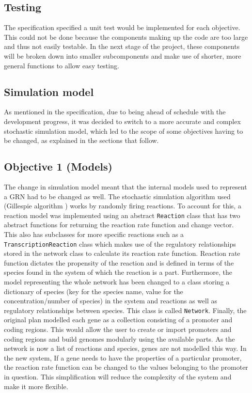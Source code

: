 \documentclass{article}
\begin{document}
	\subsection{Testing} \label{progress-testing}
	The specification specified a unit test would be implemented for each objective. This could not be done because the components making up the code are too large and thus not easily testable. In the next stage of the project, these components will be broken down into smaller subcomponents and make use of shorter, more general functions to allow easy testing.
	
	
	\subsection{Simulation model} \label{sim-model}
	As mentioned in the specification, due to being ahead of schedule with the development progress, it was decided to switch to a more accurate and complex stochastic simulation model, which led to the scope of some objectives having to be changed, as explained in the sections that follow.
	
	\subsection{Objective 1 (Models)}  
	The change in simulation model meant that the internal models used to represent a GRN had to be changed as well. The stochastic simulation algorithm used (Gillespie algorithm \cite{gillespie_original}) works by randomly firing reactions. To account for this, a reaction model was implemented using an abstract \verb|Reaction| class that has two abstract functions for returning the reaction rate function and change vector. This also has subclasses for more specific reactions such as a \verb|TranscriptionReaction| class which makes use of the regulatory relationships stored in the network class to calculate its reaction rate function. Reaction rate function dictates the propensity of the reaction and is defined in terms of the species found in the system of which the reaction is a part. Furthermore, the model representing the whole network has been changed to a class storing a dictionary of species (key for the species name, value for the concentration/number of species) in the system and reactions as well as regulatory relationships between species. This class is called \verb|Network|. Finally, the original plan modelled each gene as a collection consisting of a promoter and coding regions. This would allow the user to create or import promoters and coding regions and build genomes modularly using the available parts. As the network is now a list of reactions and species, genes are not modelled this way. In the new system, If a gene needs to have the properties of a particular promoter, the reaction rate function can be changed to the values belonging to the promoter in question. This simplification will reduce the complexity of the system and make it more flexible.
	
\end{document}
